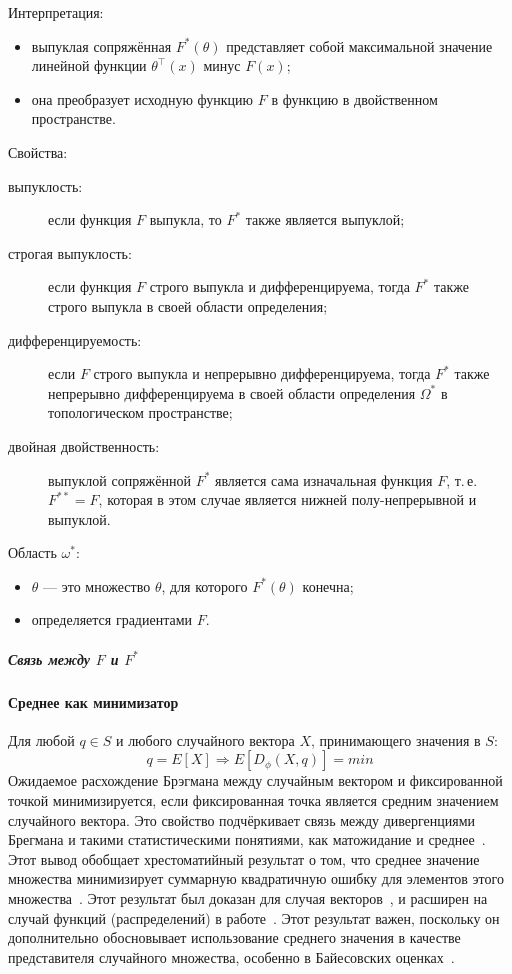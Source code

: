 \documentclass[12pt]{scrartcl}
\begin{document}
Интерпретация:
\begin{itemize}
    \item выпуклая сопряжённая $F^{*}(\theta)$ представляет собой максимальной значение линейной функции $\theta^{\top}(x)$ минус $F(x)$;
    \item она преобразует исходную функцию $F$ в функцию в двойственном пространстве.
\end{itemize}
Свойства:
\begin{description}
    \item[выпуклость:] если функция $F$ выпукла, то $F^{*}$ также является выпуклой;
    \item[строгая выпуклость:] если функция $F$ строго выпукла и дифференцируема, тогда $F^{*}$ также строго выпукла в своей области определения;
    \item[дифференцируемость:] если $F$ строго выпукла и непрерывно дифференцируема, тогда $F^{*}$ также непрерывно дифференцируема в своей области определения $\Omega^{*}$ в топологическом пространстве;
    \item[двойная двойственность:] выпуклой сопряжённой $F^{*}$ является сама изначальная функция $F$, т.\,е. $F^{**} = F$, которая в этом случае является нижней полу-непрерывной и выпуклой.
\end{description}
Область $\omega^{*}$:
\begin{itemize}
    \item $\theta$ --- это множество $\theta$, для которого $F^{*}(\theta)$ конечна;
    \item определяется градиентами $F$.
\end{itemize}
\subparagraph{Связь между $F$ и $F^{*}$}



\paragraph{Среднее как минимизатор}\label{par:mean_as_minimizer}
Для любой $q \in S$ и любого случайного вектора $X$, принимающего значения в $S$:
\begin{equation}
    q =  E[X] \Longrightarrow E[D_\phi (X,q)] = min
\end{equation}
Ожидаемое расхождение Брэгмана между случайным вектором и фиксированной точкой минимизируется, если фиксированная точка является средним значением случайного вектора. Это свойство подчёркивает связь между дивергенциями Брегмана и такими статистическими понятиями, как матожидание и среднее~\cite{Iyer2012}. Этот вывод обобщает хрестоматийный результат о том, что среднее значение множества минимизирует суммарную квадратичную ошибку для элементов этого множества~\cite{Nielsen2007a}.  Этот результат был доказан для случая векторов~\cite{JMLR:v6:banerjee05b}, и расширен на случай функций (распределений) в работе~\cite{Frigyik2008}. Этот результат важен, поскольку он дополнительно обосновывает использование среднего значения в качестве представителя случайного множества, особенно в Байесовских оценках~\cite{Jiao2014}.
\end{document}
